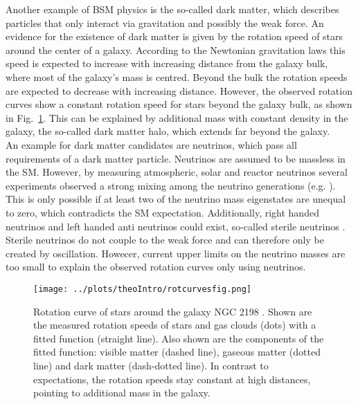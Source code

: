 \noindent Another example of BSM physics is the so-called dark matter, which describes particles that only interact via gravitation and possibly the weak force. An evidence for the existence of dark matter is given by the rotation speed of stars around the center of a galaxy. According to the Newtonian gravitation laws this speed is expected to increase with increasing distance from the galaxy bulk, where most of the galaxy's mass is centred. Beyond the bulk the rotation speeds are expected to decrease with increasing distance. However, the observed rotation curves show a constant rotation speed for stars beyond the galaxy bulk, as shown in Fig.~\ref{fig:theo:rotcurves}. This can be explained by additional mass with constant density in the galaxy, the so-called dark matter halo, which extends far beyond the galaxy.\\ 
 
\noindent An example for dark matter candidates are neutrinos, which pass all requirements of a dark matter particle. Neutrinos are assumed to be massless in the SM. However, by measuring atmospheric, solar and reactor neutrinos several experiments observed a strong mixing among the neutrino generations (e.g. \cite{nuoszi1,nuoszi2,nuoszi3,nuoszi4}). This is only possible if at least two of the neutrino mass eigenstates are unequal to zero, which contradicts the SM expectation. Additionally, right handed neutrinos and left handed anti neutrinos could exist, so-called sterile neutrinos \cite{sterilenu}. Sterile neutrinos do not couple to the weak force and can therefore only be created by oscillation. Howecer, current upper limits on the neutrino masses are too small \cite{numasses1,numasses2} to explain the observed rotation curves only using neutrinos.\\

\begin{figure}
	\centering
	\texttt{[image: ../plots/theoIntro/rotcurvesfig.png]}
	\caption[Rotation curve of stars around the galaxy NGC 2198]{Rotation curve of stars around the galaxy NGC 2198 \cite{rotcurves}. Shown are the measured rotation speeds of stars and gas clouds (dots) with a fitted function (straight line). Also shown are the components of the fitted function: visible matter (dashed line), gaseous matter (dotted line) and dark matter (dash-dotted line). In contrast to expectations, the rotation speeds stay constant at high distances, pointing to additional mass in the galaxy.}
	\label{fig:theo:rotcurves}
\end{figure}

